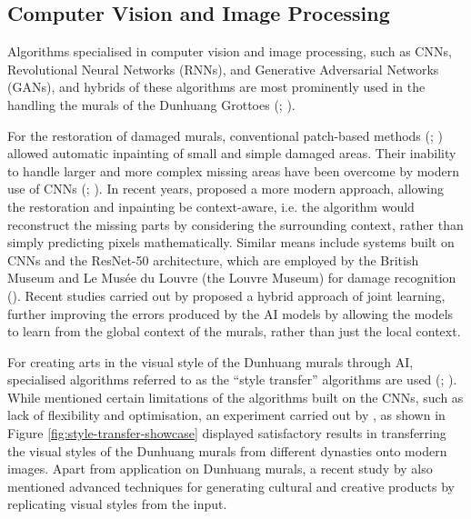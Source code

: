 \subsection{Computer Vision and Image Processing}

Algorithms specialised in computer vision and image processing, such as CNNs, Revolutional Neural Networks
(RNNs), and Generative Adversarial Networks (GANs), and hybrids of these algorithms are most prominently
used in the handling the murals of the Dunhuang Grottoes (;
).

For the restoration of damaged murals, conventional patch-based methods
(; )
allowed automatic inpainting of small and simple damaged areas. Their inability to handle larger and more complex
missing areas have been overcome by modern use of CNNs (;
).
In recent years,  proposed a more modern approach,
allowing the restoration and inpainting be context-aware, i.e. the algorithm would reconstruct the missing parts
by considering the surrounding context, rather than simply predicting pixels mathematically.
Similar means include systems built on CNNs and the ResNet-50 architecture, which are employed by the British
Museum and Le Musée du Louvre (the Louvre Museum) for damage recognition
().
Recent studies carried out by  proposed a hybrid approach of joint
learning, further improving the errors produced by the AI models by allowing the models to learn from the global
context of the murals, rather than just the local context.

For creating arts in the visual style of the Dunhuang murals through AI, specialised algorithms referred to as
the ``style transfer'' algorithms are used (;
). While  mentioned certain limitations of the
algorithms built on the CNNs, such as lack of flexibility and optimisation, an experiment carried out by 
, as shown in Figure \ref{fig:style-transfer-showcase}
displayed satisfactory results in transferring
the visual styles of the Dunhuang murals from different dynasties onto modern images.
Apart from application on Dunhuang murals,
a recent study by  also mentioned advanced techniques for generating
cultural and creative products by replicating visual styles from the input.

